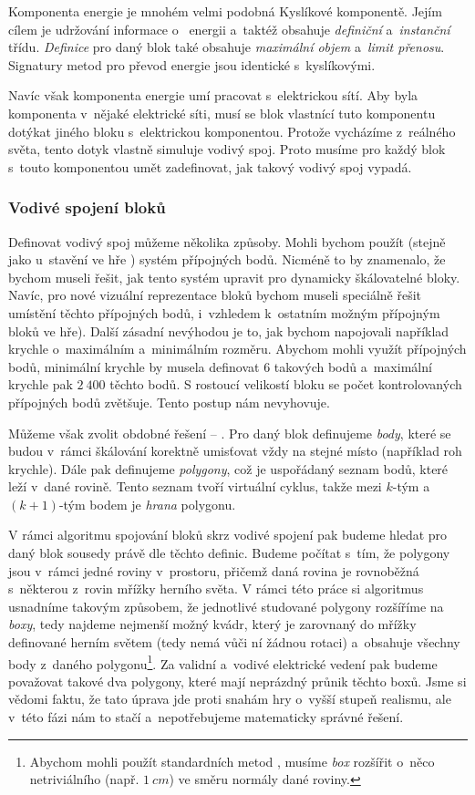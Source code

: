 Komponenta energie je mnohém velmi podobná Kyslíkové komponentě. Jejím cílem je udržování informace o~ energii a~taktéž obsahuje \textit{definiční} a~\textit{instanční} třídu. \textit{Definice} pro daný blok také obsahuje \textit{maximální objem} a~\textit{limit přenosu}. Signatury metod pro převod energie jsou identické s~kyslíkovými.

Navíc však komponenta energie umí pracovat s~elektrickou sítí. Aby byla komponenta v~nějaké elektrické síti, musí se blok vlastnící tuto komponentu dotýkat jiného bloku s~elektrickou komponentou. Protože vycházíme z~reálného světa, tento dotyk vlastně simuluje vodivý spoj. Proto musíme pro každý blok s~touto komponentou umět zadefinovat, jak takový vodivý spoj vypadá.

\subsubsection{Vodivé spojení bloků}

Definovat vodivý spoj můžeme několika způsoby. Mohli bychom použít (stejně jako u~stavění ve hře \TM{}) systém přípojných bodů. Nicméně to by znamenalo, že bychom museli řešit, jak tento systém upravit pro dynamicky škálovatelné bloky. Navíc, pro nové vizuální reprezentace bloků bychom museli speciálně řešit umístění těchto přípojných bodů, i~vzhledem k~ostatním možným přípojným bloků ve hře). Další zásadní nevýhodou je to, jak bychom napojovali například krychle o~maximálním a~minimálním rozměru. Abychom mohli využít přípojných bodů, minimální krychle by musela definovat $6$ takových bodů a~maximální krychle pak $2~400$ těchto bodů. S rostoucí velikostí bloku se počet kontrolovaných přípojných bodů zvětšuje.  Tento postup nám nevyhovuje.

Můžeme však zvolit obdobné řešení -- . Pro daný blok definujeme \textit{body}, které se budou v~rámci škálování korektně umisťovat vždy na stejné místo (například roh krychle). Dále pak definujeme \textit{polygony}, což je uspořádaný seznam bodů, které leží v~dané rovině. Tento seznam tvoří virtuální cyklus, takže mezi $k$-tým a~$(k+1)$-tým bodem je \textit{hrana} polygonu.

V rámci algoritmu spojování bloků skrz vodivé spojení pak budeme hledat pro daný blok sousedy právě dle těchto definic. Budeme počítat s~tím, že polygony jsou v~rámci jedné roviny v~prostoru, přičemž daná rovina je rovnoběžná s~některou z~rovin mřížky herního světa. V rámci této práce si algoritmus usnadníme takovým způsobem, že jednotlivé studované polygony rozšíříme na \textit{boxy}, tedy najdeme nejmenší možný kvádr, který je zarovnaný do mřížky definované herním světem (tedy nemá vůči ní žádnou rotaci) a~obsahuje všechny body z~daného polygonu\footnote{Abychom mohli použít standardních metod , musíme \textit{box} rozšířit o~něco netriviálního (např. $1~cm$) ve směru normály dané roviny.}. Za validní a~vodivé elektrické vedení pak budeme považovat takové dva polygony, které mají neprázdný průnik těchto boxů. Jsme si vědomi faktu, že tato úprava jde proti snahám hry o~vyšší stupeň realismu, ale v~této fázi nám to stačí a~nepotřebujeme matematicky správné řešení.


